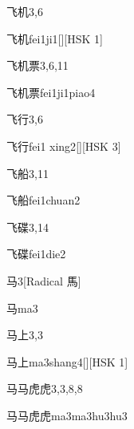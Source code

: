 \begin{entry}{飞机}{3,6}
  \begin{phonetics}{飞机}{fei1ji1}[][HSK 1]
  \end{phonetics}
\end{entry}

\begin{entry}{飞机票}{3,6,11}
  \begin{phonetics}{飞机票}{fei1ji1piao4}
  \end{phonetics}
\end{entry}

\begin{entry}{飞行}{3,6}
  \begin{phonetics}{飞行}{fei1 xing2}[][HSK 3]
  \end{phonetics}
\end{entry}

\begin{entry}{飞船}{3,11}
  \begin{phonetics}{飞船}{fei1chuan2}
  \end{phonetics}
\end{entry}

\begin{entry}{飞碟}{3,14}
  \begin{phonetics}{飞碟}{fei1die2}
  \end{phonetics}
\end{entry}

\begin{entry}{马}{3}[Radical 馬]
  \begin{phonetics}{马}{ma3}
  \end{phonetics}
\end{entry}

\begin{entry}{马上}{3,3}
  \begin{phonetics}{马上}{ma3shang4}[][HSK 1]
  \end{phonetics}
\end{entry}

\begin{entry}{马马虎虎}{3,3,8,8}
  \begin{phonetics}{马马虎虎}{ma3ma3hu3hu3}
  \end{phonetics}
\end{entry}


